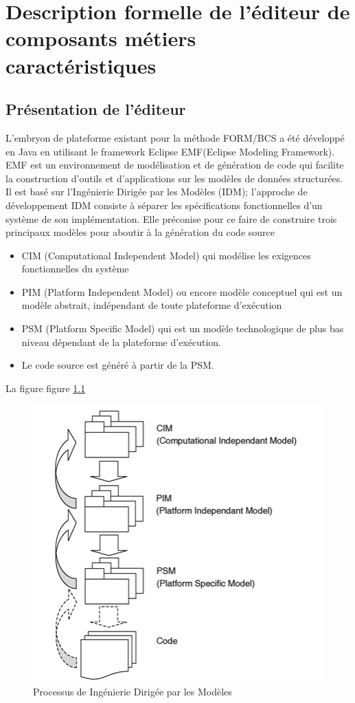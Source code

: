 \chapter {Description formelle de l'éditeur de composants métiers caractéristiques}

\section{Présentation de l'éditeur}
L'embryon de plateforme existant pour la méthode FORM/BCS a été développé en Java en utilisant le framework Eclipse EMF(Eclipse Modeling Framework). EMF est un environnement de modélisation et de génération de code qui facilite la construction d'outils et d'applications sur les modèles de données structurées. Il est basé sur l'Ingénierie Dirigée par les Modèles (IDM); l'approche de développement IDM consiste à séparer les spécifications fonctionnelles d'un système de son implémentation. Elle préconise pour ce faire de construire trois principaux modèles pour aboutir à la génération du code source 
\begin{itemize}
	\item CIM (Computational Independent Model) qui modélise les exigences fonctionnelles du système
	\item PIM (Platform Independent Model) ou encore modèle conceptuel qui est un modèle abstrait, indépendant de toute plateforme d'exécution 
	\item PSM (Platform Specific Model) qui est un modèle technologique de plus bas niveau dépendant de la plateforme d'exécution.
	\item Le code source est généré à partir de la PSM. 
	\end{itemize}
	
	La figure figure \ref{fig:MDA_process}
	
\begin{figure}[h!]
  \includegraphics[scale=0.7]{images/mda_technology.png}
  \caption{Processus de Ingénierie Dirigée par les Modèles}
  \label{fig:MDA_process}
\end{figure}
	
